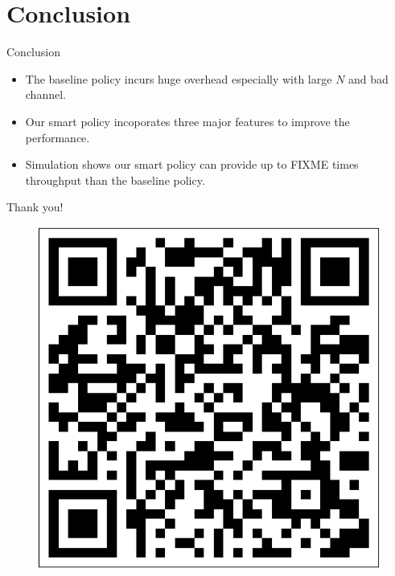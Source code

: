 \documentclass{beamer}
\begin{document}
\section*{Conclusion}
\begin{frame}{Conclusion}
  \begin{itemize}
    \item The baseline policy incurs huge overhead especially with large $N$ and bad channel.
    \item Our smart policy incoporates three major features to improve the performance.
    \item Simulation shows our smart policy can provide up to FIXME times throughput than the baseline policy.
  \end{itemize}
\end{frame}

\begin{frame}
  \begin{center}
    {\Huge\calligra Thank you!}
  \end{center}
  \begin{figure}[htbp]
    \centering
    \includegraphics[height=.2\textheight]{url.pdf}
  \end{figure}
\end{frame}
\end{document}
